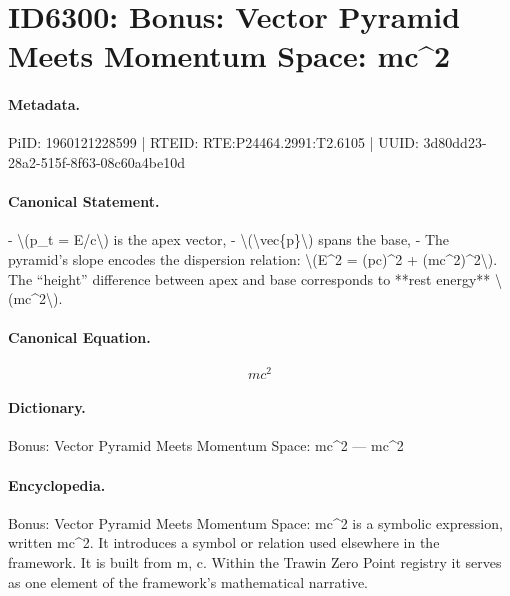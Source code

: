 \section*{ID6300: Bonus: Vector Pyramid Meets Momentum Space: mc\textasciicircum{}2}
\paragraph{Metadata.}
PiID: 1960121228599 | RTEID: RTE:P24464.2991:T2.6105 | UUID: 3d80dd23-28a2-515f-8f63-08c60a4be10d

\paragraph{Canonical Statement.}
- \textbackslash{}(p\_t = E/c\textbackslash{}) is the apex vector, - \textbackslash{}(\textbackslash{}vec\{p\}\textbackslash{}) spans the base, - The pyramid’s slope encodes the dispersion relation: \textbackslash{}(E\textasciicircum{}2 = (pc)\textasciicircum{}2 + (mc\textasciicircum{}2)\textasciicircum{}2\textbackslash{}). The “height” difference between apex and base corresponds to **rest energy** \textbackslash{}(mc\textasciicircum{}2\textbackslash{}).

\paragraph{Canonical Equation.}
\[
mc^2
\]

\paragraph{Dictionary.}
Bonus: Vector Pyramid Meets Momentum Space: mc\textasciicircum{}2 — mc\textasciicircum{}2

\paragraph{Encyclopedia.}
Bonus: Vector Pyramid Meets Momentum Space: mc\textasciicircum{}2 is a symbolic expression, written mc\textasciicircum{}2. It introduces a symbol or relation used elsewhere in the framework. It is built from m, c. Within the Trawin Zero Point registry it serves as one element of the framework's mathematical narrative.
